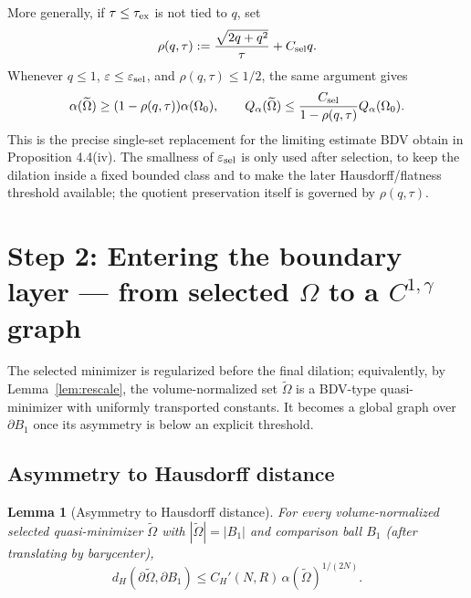 \documentclass[11pt]{amsart}
\newtheorem{lemma}[theorem]{Lemma}
\theoremstyle{definition}
\newcommand{\abs}[1]{\left|#1\right|}
\begin{document}
More generally, if \(\tau\le\tau_{\rm ex}\) is not tied to \(q\), set
\[
\rho(q,\tau)
:=
\frac{\sqrt{2q+q^2}}{\tau}+C_{\rm sel}q.
\]
Whenever \(q\le1\), \(\varepsilon\le\varepsilon_{\rm sel}\), and
\(\rho(q,\tau)\le1/2\), the same argument gives
\[
\alpha(\widetilde\Omega)\ge(1-\rho(q,\tau))\alpha(\Omega_0),
\qquad
Q_\alpha(\widetilde\Omega)
\le
\frac{C_{\rm sel}}{1-\rho(q,\tau)}Q_\alpha(\Omega_0).
\]
This is the precise single-set replacement for the limiting estimate BDV
obtain in Proposition 4.4(iv). The smallness of \(\varepsilon_{\rm sel}\) is
only used after selection, to keep the dilation inside a fixed bounded class
and to make the later Hausdorff/flatness threshold available; the quotient
preservation itself is governed by \(\rho(q,\tau)\).

\section{Step 2: Entering the boundary layer --- from selected $\Omega$ to a $C^{1,\gamma}$ graph}\label{sec:step2-bdry}

The selected minimizer is regularized before the final dilation; equivalently,
by Lemma~\ref{lem:rescale}, the volume-normalized set
$\widetilde\Omega$ is a BDV-type quasi-minimizer with uniformly transported
constants. It becomes a global graph over $\partial B_1$ once its asymmetry is
below an explicit threshold.

\subsection{Asymmetry to Hausdorff distance}

\begin{lemma}[Asymmetry to Hausdorff distance]\label{lem:alphaH}
For every volume-normalized selected quasi-minimizer $\widetilde\Omega$ with
$\abs{\widetilde\Omega}=\abs{B_1}$ and comparison ball $B_1$ (after
translating by barycenter),
\[
d_H(\partial\widetilde\Omega,\partial B_1)
\le C_H'(N,R)\,\alpha(\widetilde\Omega)^{1/(2N)}.
\]
\end{lemma}
\end{document}
